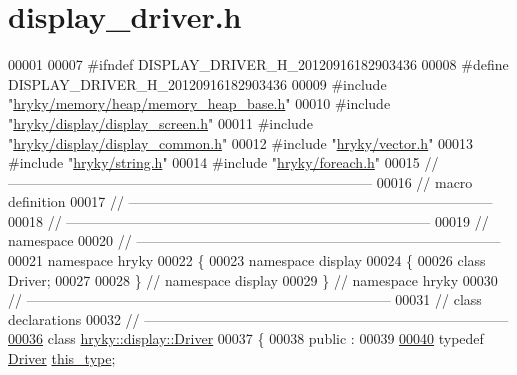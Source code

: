 \hypertarget{display__driver_8h_source}{\section{display\-\_\-driver.\-h}
}

\begin{DoxyCode}
00001 
00007 \textcolor{preprocessor}{#ifndef DISPLAY\_DRIVER\_H\_20120916182903436}
00008 \textcolor{preprocessor}{}\textcolor{preprocessor}{#define DISPLAY\_DRIVER\_H\_20120916182903436}
00009 \textcolor{preprocessor}{}\textcolor{preprocessor}{#include "\hyperlink{memory__heap__base_8h}{hryky/memory/heap/memory_heap_base.h}"}
00010 \textcolor{preprocessor}{#include "\hyperlink{display__screen_8h}{hryky/display/display_screen.h}"}
00011 \textcolor{preprocessor}{#include "\hyperlink{display__common_8h}{hryky/display/display_common.h}"}
00012 \textcolor{preprocessor}{#include "\hyperlink{vector_8h}{hryky/vector.h}"}
00013 \textcolor{preprocessor}{#include "\hyperlink{string_8h}{hryky/string.h}"}
00014 \textcolor{preprocessor}{#include "\hyperlink{foreach_8h}{hryky/foreach.h}"}
00015 \textcolor{comment}{//
      ------------------------------------------------------------------------------}
00016 \textcolor{comment}{// macro definition}
00017 \textcolor{comment}{//
      ------------------------------------------------------------------------------}
00018 \textcolor{comment}{//
      ------------------------------------------------------------------------------}
00019 \textcolor{comment}{// namespace}
00020 \textcolor{comment}{//
      ------------------------------------------------------------------------------}
00021 \textcolor{keyword}{namespace }hryky
00022 \{
00023 \textcolor{keyword}{namespace }display
00024 \{
00026     \textcolor{keyword}{class }Driver;
00027 
00028 \} \textcolor{comment}{// namespace display}
00029 \} \textcolor{comment}{// namespace hryky}
00030 \textcolor{comment}{//
      ------------------------------------------------------------------------------}
00031 \textcolor{comment}{// class declarations}
00032 \textcolor{comment}{//
      ------------------------------------------------------------------------------}
\hypertarget{display__driver_8h_source_l00036}{}\hyperlink{classhryky_1_1display_1_1_driver}{00036} \textcolor{comment}{}\textcolor{keyword}{class }\hyperlink{classhryky_1_1display_1_1_driver}{hryky::display::Driver}
00037 \{
00038 \textcolor{keyword}{public} :
00039 
\hypertarget{display__driver_8h_source_l00040}{}\hyperlink{classhryky_1_1display_1_1_driver_aeed838549fff082eceb3504a3b701fb5}{00040}     \textcolor{keyword}{typedef} \hyperlink{classhryky_1_1display_1_1_driver}{Driver}              \hyperlink{classhryky_1_1display_1_1_driver_aeed838549fff082eceb3504a3b701fb5}{this_type};

\end{DoxyCode}
